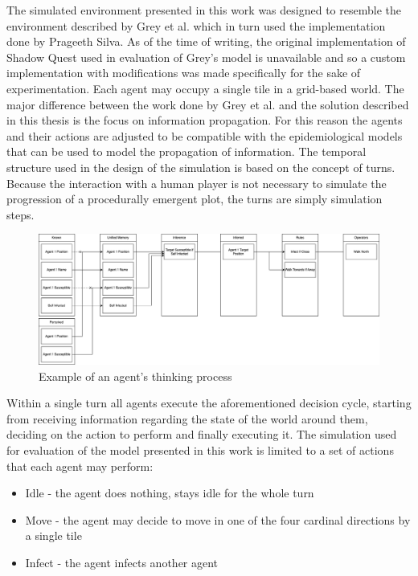 \label{chapter:chapter2}

The simulated environment presented in this work was designed to resemble the environment described by Grey et al.\cite{grey2011procedural} which in turn used the implementation done by Prageeth Silva\cite{silva2010shadow}.
As of the time of writing, the original implementation of Shadow Quest used in evaluation of Grey's model is unavailable and so a custom implementation with modifications was made specifically for the sake of experimentation.
Each agent may occupy a single tile in a grid-based world.
The major difference between the work done by Grey et al. and the solution described in this thesis is the focus on information propagation.
For this reason the agents and their actions are adjusted to be compatible with the epidemiological models that can be used to model the propagation of information.
The temporal structure used in the design of the simulation is based on the concept of turns.
Because the interaction with a human player is not necessary to simulate the progression of a procedurally emergent plot, the turns are simply simulation steps.

\begin{figure}[H]
    \centering
    \includegraphics[width=1.0\textwidth]{images/chapter1/agent_think.drawio.png}
    \caption{Example of an agent's thinking process}\label{fig:agent_think.drawio.png}
\end{figure}

Within a single turn all agents execute the aforementioned decision cycle, starting from receiving information regarding the state of the world around them, deciding on the action to perform and finally executing it.
The simulation used for evaluation of the model presented in this work is limited to a set of actions that each agent may perform:

\begin{itemize}
    \item Idle - the agent does nothing, stays idle for the whole turn
    \item Move - the agent may decide to move in one of the four cardinal directions by a single tile
    \item Infect - the agent infects another agent
\end{itemize}

